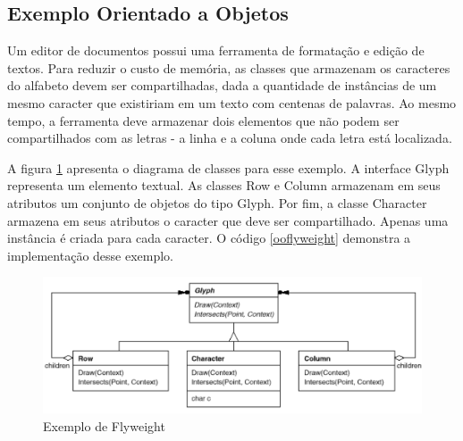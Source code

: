 \subsection*{Exemplo Orientado a Objetos}

Um editor de documentos possui uma ferramenta 
de formatação e edição de textos. Para reduzir o 
custo de memória, as classes que armazenam os 
caracteres do alfabeto devem ser compartilhadas, 
dada a quantidade de instâncias de um mesmo caracter 
que existiriam em um texto com centenas de palavras. 
Ao mesmo tempo, a ferramenta deve armazenar dois 
elementos que não podem ser compartilhados com as 
letras - a linha e a coluna onde cada letra está 
localizada. 

A figura \ref{flyweight_exemplo} apresenta o diagrama 
de classes para esse exemplo. A interface Glyph 
representa um elemento textual. As classes Row e 
Column armazenam em seus atributos um conjunto de objetos 
do tipo Glyph. 
Por fim, a classe Character armazena em seus atributos 
o caracter que deve ser compartilhado. Apenas uma 
instância é criada para cada caracter. O 
código \ref{ooflyweight} demonstra a implementação 
desse exemplo.

\begin{figure}[htb]
	\caption{\label{flyweight_exemplo}Exemplo de Flyweight}
	\begin{center}
	    \includegraphics[scale=0.45]{5_padroes-contexto-funcional/5.2_estruturais/5.2.6_flyweight/flyweight_exemplo.png}
	\end{center}
\end{figure}

